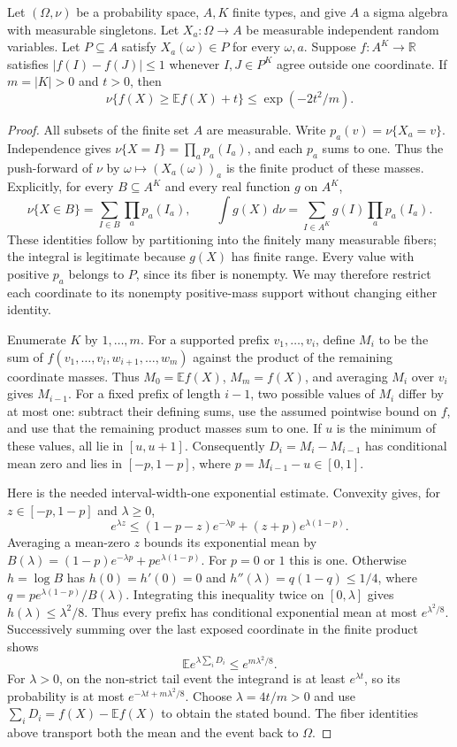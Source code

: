 \begin{lemma}
Let $(\Omega,\nu)$ be a probability space, $A,K$ finite types, and give
$A$ a sigma algebra with measurable singletons. Let $X_a:\Omega\to A$
be measurable independent random variables. Let $P\subseteq A$ satisfy
$X_a(\omega)\in P$ for every $\omega,a$. Suppose
$f:A^K\to\mathbb R$ satisfies $|f(I)-f(J)|\le1$ whenever $I,J\in P^K$
agree outside one coordinate. If $m=|K|>0$ and $t>0$, then
\[
\nu\{f(X)\ge\mathbb E f(X)+t\}\le \exp(-2t^2/m).
\]
\end{lemma}
\begin{proof}
All subsets of the finite set $A$ are measurable. Write
$p_a(v)=\nu\{X_a=v\}$. Independence gives
$\nu\{X=I\}=\prod_a p_a(I_a)$, and each $p_a$ sums to one.
Thus the push-forward of $\nu$ by $\omega\mapsto(X_a(\omega))_a$
is the finite product of these masses. Explicitly, for every $B\subseteq A^K$
and every real function $g$ on $A^K$,
\[
\nu\{X\in B\}=\sum_{I\in B}\prod_a p_a(I_a),\qquad
\int g(X)\,d\nu=\sum_{I\in A^K}g(I)\prod_a p_a(I_a).
\]
These identities follow by partitioning into the finitely many measurable
fibers; the integral is legitimate because $g(X)$ has finite range.
Every value with positive $p_a$ belongs to $P$, since its fiber is
nonempty. We may therefore restrict each coordinate to its nonempty
positive-mass support without changing either identity.

Enumerate $K$ by $1,\ldots,m$. For a supported prefix $v_1,\ldots,v_i$,
define $M_i$ to be the sum of $f(v_1,\ldots,v_i,w_{i+1},\ldots,w_m)$
against the product of the remaining coordinate masses. Thus $M_0=\mathbb Ef(X)$,
$M_m=f(X)$, and averaging $M_i$ over $v_i$ gives $M_{i-1}$.
For a fixed prefix of length $i-1$, two possible values of $M_i$ differ
by at most one: subtract their defining sums, use the assumed pointwise
bound on $f$, and use that the remaining product masses sum to one.
If $u$ is the minimum of these values, all lie in $[u,u+1]$.
Consequently $D_i=M_i-M_{i-1}$ has conditional mean zero and lies
in $[-p,1-p]$, where $p=M_{i-1}-u\in[0,1]$.

Here is the needed interval-width-one exponential estimate. Convexity
gives, for $z\in[-p,1-p]$ and $\lambda\ge0$,
\[
e^{\lambda z}\le(1-p-z)e^{-\lambda p}+(z+p)e^{\lambda(1-p)}.
\]
Averaging a mean-zero $z$ bounds its exponential mean by
$B(\lambda)=(1-p)e^{-\lambda p}+pe^{\lambda(1-p)}$.
For $p=0$ or $1$ this is one. Otherwise $h=\log B$ has
$h(0)=h'(0)=0$ and $h''(\lambda)=q(1-q)\le1/4$, where
$q=pe^{\lambda(1-p)}/B(\lambda)$. Integrating this inequality twice
on $[0,\lambda]$ gives $h(\lambda)\le\lambda^2/8$.
Thus every prefix has conditional exponential mean at most
$e^{\lambda^2/8}$. Successively summing over the last exposed coordinate
in the finite product shows
\[
\mathbb E e^{\lambda\sum_iD_i}\le e^{m\lambda^2/8}.
\]
For $\lambda>0$, on the non-strict tail event the integrand is at least
$e^{\lambda t}$, so its probability is at most
$e^{-\lambda t+m\lambda^2/8}$. Choose $\lambda=4t/m>0$ and use
$\sum_iD_i=f(X)-\mathbb Ef(X)$ to obtain the stated bound. The fiber
identities above transport both the mean and the event back to $\Omega$.
\end{proof}
